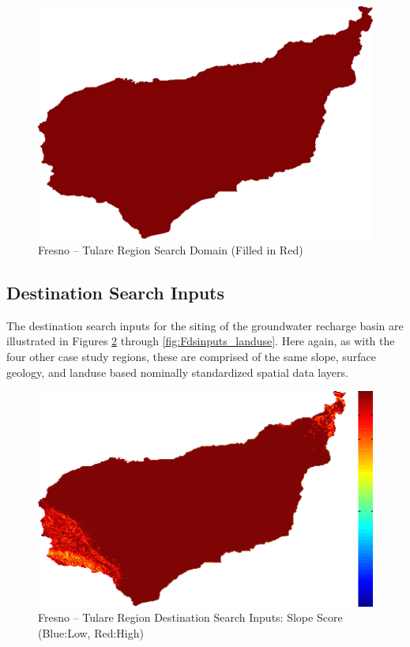         \begin{figure}[!h]
            \begin{center}
            \includegraphics[width=5.5in]{figures/Fresno_SearchDomain.png}   
            \caption{Fresno -- Tulare Region Search Domain (Filled in Red)}
            \label{fig:Fdomain}
            \end{center}
        \end{figure}
        
    \subsection{Destination Search Inputs}
    
The destination search inputs for the siting of the groundwater recharge basin are illustrated in Figures \ref{fig:Fdsinputs_slope} through \ref{fig:Fdsinputs_landuse}. Here again, as with the four other case study regions, these are comprised of the same slope, surface geology, and landuse based nominally standardized spatial data layers.
    
        \begin{figure}[!h]
            \begin{center}
            \includegraphics[width=5.5in]{figures/Fresno_Search_Slope.png}   
            \caption{Fresno -- Tulare Region Destination Search Inputs: Slope Score (Blue:Low, Red:High)}
            \label{fig:Fdsinputs_slope}
            \end{center}
        \end{figure}
        
